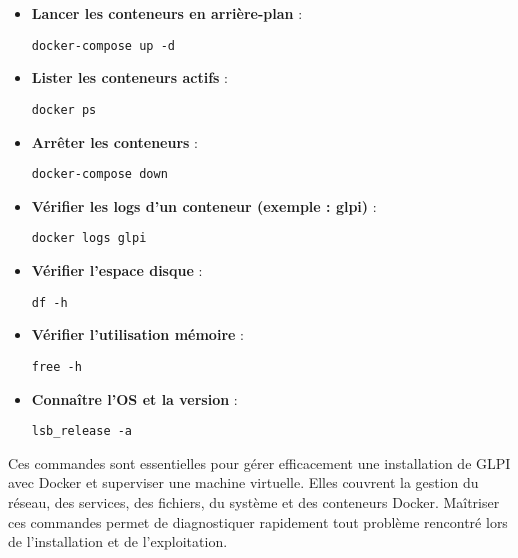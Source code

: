 \documentclass[11pt,a4paper]{article}
\begin{document}
\begin{tcolorbox}[title={5. Commandes Docker importantes}]
\begin{itemize}
  \item \textbf{Lancer les conteneurs en arrière-plan} :
\begin{verbatim}
docker-compose up -d
\end{verbatim}

  \item \textbf{Lister les conteneurs actifs} :
\begin{verbatim}
docker ps
\end{verbatim}

  \item \textbf{Arrêter les conteneurs} :
\begin{verbatim}
docker-compose down
\end{verbatim}

  \item \textbf{Vérifier les logs d’un conteneur (exemple : glpi)} :
\begin{verbatim}
docker logs glpi
\end{verbatim}
\end{itemize}
\end{tcolorbox}

\begin{tcolorbox}[title={6. Commandes système utiles}]
\begin{itemize}
  \item \textbf{Vérifier l’espace disque} :
\begin{verbatim}
df -h
\end{verbatim}

  \item \textbf{Vérifier l’utilisation mémoire} :
\begin{verbatim}
free -h
\end{verbatim}

  \item \textbf{Connaître l’OS et la version} :
\begin{verbatim}
lsb_release -a
\end{verbatim}
\end{itemize}
\end{tcolorbox}

\begin{tcolorbox}[title={Conclusion}]
Ces commandes sont essentielles pour gérer efficacement une installation de GLPI avec Docker et superviser une machine virtuelle.  
Elles couvrent la gestion du réseau, des services, des fichiers, du système et des conteneurs Docker.  
Maîtriser ces commandes permet de diagnostiquer rapidement tout problème rencontré lors de l’installation et de l’exploitation.
\end{tcolorbox}
\end{document}
